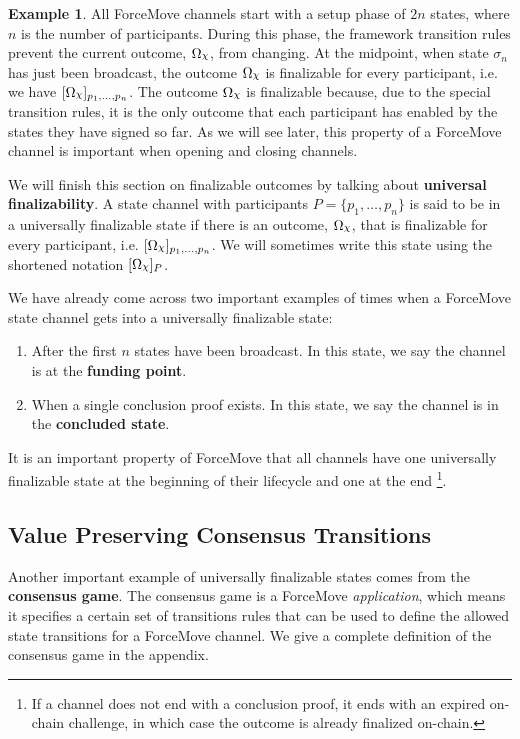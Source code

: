 \documentclass{article}
\DeclareRobustCommand{\rchi}{{\mathpalette\irchi\relax}}
\newcommand{\irchi}[2]{\raisebox{\depth}{$#1\chi$}} %
\theoremstyle{definition}
\newtheorem{example}{Example}[section]
\newcommand{\enf}[1]{[#1]}
\begin{document}
\begin{example}{}
  All ForceMove channels start with a setup phase of $2n$ states, where $n$ is the number of participants.
  During this phase, the framework transition rules prevent the current outcome, $\Omega_\rchi$, from changing.
  At the midpoint, when state $\sigma_n$ has just been broadcast, the outcome
  $\Omega_\rchi$ is finalizable for every participant, i.e. we have
  $\enf{\Omega_\rchi}_{p_1, \dots, p_n}$.
  The outcome $\Omega_\rchi$ is finalizable because, due to the special transition rules,
  it is the only outcome that each participant has enabled by the states they have signed so far.
  As we will see later, this property of a ForceMove channel is important when opening and
  closing channels.
\end{example}

We will finish this section on finalizable outcomes by talking about \textbf{universal finalizability}.
A state channel with participants $P = \{p_1, \dots, p_n\}$ is said to be in a universally finalizable
state if there is an outcome, $\Omega_\rchi$, that is finalizable for every participant, i.e.
$\enf{\Omega_\rchi}_{p_1,\dots, p_n}$.
We will sometimes write this state using the shortened notation $\enf{\Omega_\rchi}_P$.

We have already come across two important examples of times when a ForceMove state channel
gets into a universally finalizable state:
\begin{enumerate}
  \item After the first $n$ states have been broadcast. In this state, we say the channel is at the \textbf{funding point}.
  \item When a single conclusion proof exists. In this state, we say the channel is in the \textbf{concluded state}.
\end{enumerate}
It is an important property of ForceMove that all channels have one universally finalizable
state at the beginning of their lifecycle and one at the end
\footnote{If a channel does not end with a conclusion proof, it ends with an expired on-chain challenge,
in which case the outcome is already finalized on-chain.}.

\subsection{Value Preserving Consensus Transitions}

Another important example of universally finalizable states comes from the \textbf{consensus game}.
The consensus game is a ForceMove \textit{application}, which means it specifies a certain
set of transitions rules that can be used to define the allowed state transitions for a ForceMove
channel.
We give a complete definition of the consensus game in the appendix.
\end{document}
